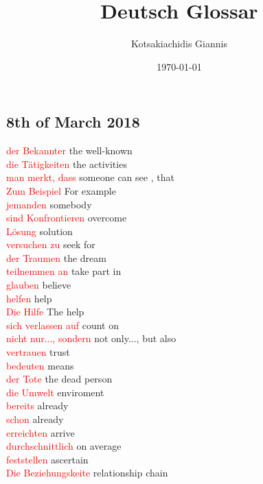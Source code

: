 \documentclass{article}
\title{\textbf{Deutsch Glossar}}
\author{Kotsakiachidis Giannis }
\date{\today }
\begin{document}
	\maketitle
	
	\clearpage
	
	\begin{multicols}{2}
	
	\section*{8th of March 2018}
	\textcolor{red}{der Bekannter} the well-known\\
	\textcolor{red}{die Tätigkeiten} the activities\\
	\textcolor{red}{man merkt, dass} someone can see , that\\
	\textcolor{red}{Zum Beispiel} For example\\
	\textcolor{red}{jemanden} somebody\\
	\textcolor{red}{sind Konfrontieren} overcome\\
	\textcolor{red}{Lösung} solution\\
	\textcolor{red}{versuchen zu} seek for\\
	\textcolor{red}{der Traumen} the dream\\
	\textcolor{red}{teilnemmen an} take part in\\
	\textcolor{red}{glauben} believe\\
	\textcolor{red}{helfen} help\\
	\textcolor{red}{Die Hilfe} The help\\
	\textcolor{red}{sich verlassen auf} count on\\
	\textcolor{red}{nicht nur..., sondern} not only..., but also\\
	\textcolor{red}{vertrauen} trust\\
	\textcolor{red}{bedeuten} means\\
	\textcolor{red}{der Tote} the dead person\\
	\textcolor{red}{die Umwelt} enviroment\\
	\textcolor{red}{bereits} already\\
	\textcolor{red}{schon} already\\
	\textcolor{red}{erreichten} arrive\\
	\textcolor{red}{durchschnittlich} on average\\
	\textcolor{red}{feststellen} ascertain\\
	\textcolor{red}{Die Beziehungskeite} relationship chain\\

\end{multicols}
\end{document}

